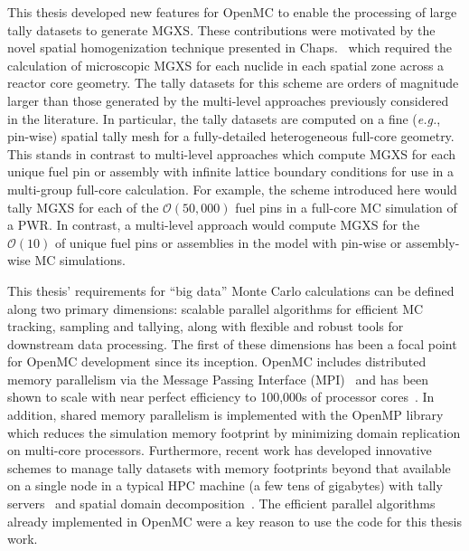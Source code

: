 This thesis developed new features for OpenMC to enable the processing of large tally datasets to generate \ac{MGXS}. These contributions were motivated by the novel spatial homogenization technique presented in 
Chaps.~ which required the calculation of microscopic \ac{MGXS} for each nuclide in each spatial zone across a reactor core geometry. The tally datasets for this scheme are orders of magnitude larger than those generated by the multi-level approaches previously considered in the literature. In particular, the tally datasets are computed on a fine (\textit{e.g.}, pin-wise) spatial tally mesh for a fully-detailed heterogeneous full-core geometry. This stands in contrast to multi-level approaches which compute \ac{MGXS} for each unique fuel pin or assembly with infinite lattice boundary conditions for use in a multi-group full-core calculation. For example, the scheme introduced here would tally \ac{MGXS} for each of the $\mathcal{O}(50,000)$ fuel pins in a full-core \ac{MC} simulation of a \ac{PWR}. In contrast, a multi-level approach would compute \ac{MGXS} for the $\mathcal{O}(10)$ of unique fuel pins or assemblies in the model with pin-wise or assembly-wise \ac{MC} simulations.

This thesis' requirements for ``big data'' Monte Carlo calculations can be defined along two primary dimensions: scalable parallel algorithms for efficient \ac{MC} tracking, sampling and tallying, along with flexible and robust tools for downstream data processing. The first of these dimensions has been a focal point for OpenMC development since its inception. OpenMC includes distributed memory parallelism via the Message Passing Interface (MPI)~\cite{gropp1996mpi} and has been shown to scale with near perfect efficiency to 100,000s of processor cores~\cite{romano2013parallel}. In addition, shared memory parallelism is implemented with the OpenMP library~\cite{siegel2014multi} which reduces the simulation memory footprint by minimizing domain replication on multi-core processors. Furthermore, recent work has developed innovative schemes to manage tally datasets with memory footprints beyond that available on a single node in a typical \ac{HPC} machine (a few tens of gigabytes) with tally servers~\cite{romano2013servers} and spatial domain decomposition~\cite{horelik2014dd}. The efficient parallel algorithms already implemented in OpenMC were a key reason to use the code for this thesis work.

